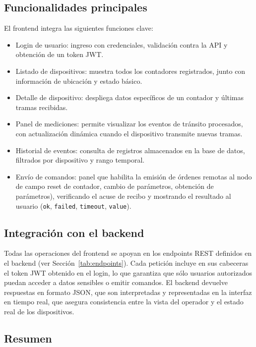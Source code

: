 \subsection{Funcionalidades principales}

El frontend integra las siguientes funciones clave:
\begin{itemize}
    \item Login de usuario: ingreso con credenciales, validación contra la API y obtención de un token JWT.
    \item Listado de dispositivos: muestra todos los contadores registrados, junto con información de ubicación y estado básico.
    \item Detalle de dispositivo: despliega datos específicos de un contador y últimas tramas recibidas.
    \item Panel de mediciones: permite visualizar los eventos de tránsito procesados, con actualización dinámica cuando el dispositivo transmite nuevas tramas.
    \item Historial de eventos: consulta de registros almacenados en la base de datos, filtrados por dispositivo y rango temporal.
    \item Envío de comandos: panel que habilita la emisión de órdenes remotas al nodo de campo  reset de contador, cambio de parámetros, obtención de parámetros), verificando el acuse de recibo y mostrando el resultado al usuario (\texttt{ok}, \texttt{failed}, \texttt{timeout}, \texttt{value}).
\end{itemize}

\subsection{Integración con el backend}

Todas las operaciones del frontend se apoyan en los endpoints REST definidos en el backend (ver Sección~\ref{tab:endpoints}).  
Cada petición incluye en sus cabeceras el token JWT obtenido en el login, lo que garantiza que sólo usuarios autorizados puedan acceder a datos sensibles o emitir comandos.  
El backend devuelve respuestas en formato JSON, que son interpretadas y representadas en la interfaz en tiempo real, que asegura consistencia entre la vista del operador y el estado real de los dispositivos.

\subsection{Resumen}

